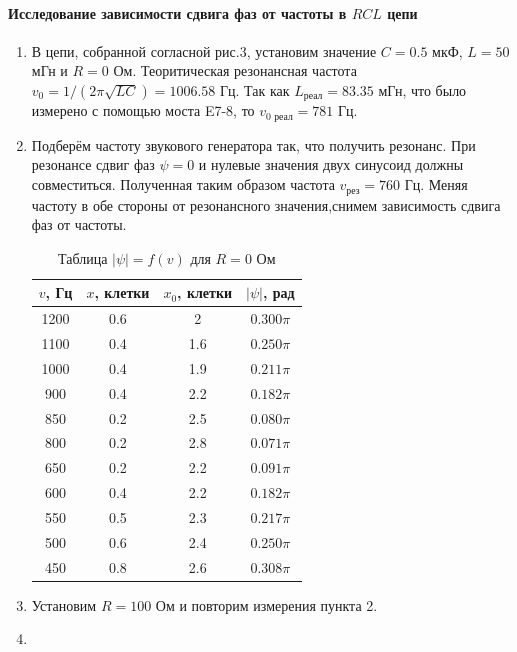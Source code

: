 \documentclass[12pt]{article}
\begin{document}
\paragraph{Исследование зависимости сдвига фаз от частоты в $RCL$ цепи}
\begin{enumerate}
	\item
		В цепи, собранной согласной рис.3, установим значение $C = 0.5$ мкФ, $L = 50$ мГн и $R = 0$ Ом. Теоритическая резонансная частота $v_0 = 1/\left(2 \pi \sqrt{LC}\right) = 1006.58$ Гц. Так как $L_\text{реал} = 83.35$ мГн, что было измерено с помощью моста E7-8, то $v_\text{0 реал} = 781$ Гц. 
	\item
		Подберём частоту звукового генератора так, что получить резонанс. При резонансе сдвиг фаз $\psi = 0$ и нулевые значения двух синусоид должны совместиться. Полученная таким образом частота $v_\text{рез} = 760$ Гц. Меняя частоту в обе стороны от резонансного значения,снимем зависимость сдвига фаз от частоты.
		\begin{table}[h!]
			\centering
			\begin{tabular}{|c|c|c|c|}
			\hline
			$v$, Гц  &  $x$, клетки & $x_0$, клетки & $|\psi|$, рад \\
 			\hline
 			1200 & 0.6 & 2 & $0.300 \pi$\\
 			\hline
 			1100 & 0.4 & 1.6 & $0.250 \pi$  \\
 			\hline
 			1000 & 0.4 & 1.9 & $0.211 \pi$\\
 			\hline
 		    900 & 0.4 & 2.2 & $0.182 \pi$\\
 			\hline
 			850 & 0.2 & 2.5 & $0.080 \pi$\\ 						
			\hline
			800 & 0.2 & 2.8 & $0.071 \pi$\\
			\hline
			\hline	
			650 & 0.2 & 2.2 & $0.091 \pi$\\
 			\hline
 			600 & 0.4 & 2.2 & $0.182 \pi$  \\
 			\hline
 			550 & 0.5 & 2.3 & $0.217 \pi$\\
 			\hline
 		    500 & 0.6 & 2.4 & $0.250 \pi$\\
 			\hline
 			450 & 0.8 & 2.6 & $0.308 \pi$\\ 						
			\hline
			\end{tabular}
			\captionsetup{labelformat = empty}
			\caption{Таблица $|\psi| = f(v)$ для $R = 0$ Ом}
			\label{table5}
		\end{table}
	\item
		Установим $R = 100$ Ом и повторим измерения пункта 2.
	\item

\end{enumerate}
\end{document}
